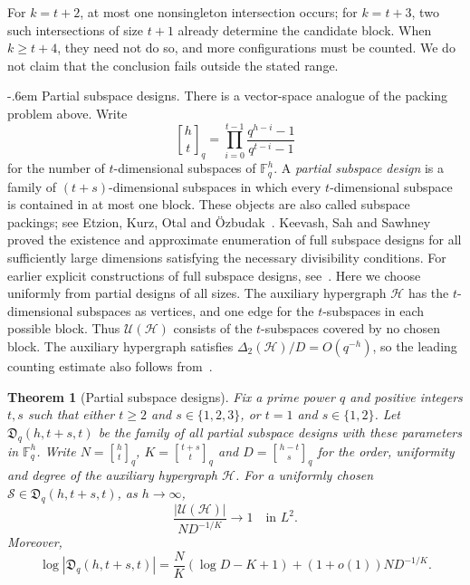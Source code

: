 \documentclass[11pt,reqno]{amsart}
\makeatletter
\numberwithin{equation}{section}
\renewcommand{\paragraph}{\@startsection{paragraph}{4}%
    \z@{.75\linespacing\@plus.2\linespacing\@minus.1\linespacing}%
    {-.6em}%
    {\normalfont\bfseries}}
\theoremstyle{plain}
\newtheorem{theorem}{Theorem}[section]
\theoremstyle{definition}
\newcommand{\calH}{\mathcal{H}}
\newcommand{\calS}{\mathcal{S}}
\newcommand{\calU}{\mathcal U}
\newcommand{\qbinom}[2]{\genfrac{[}{]}{0pt}{}{#1}{#2}_q}
\makeatother
\begin{document}
For $k=t+2$, at most one nonsingleton intersection occurs; for $k=t+3$, two such intersections of size $t+1$ already determine the candidate block.
When $k\ge t+4$, they need not do so, and more configurations must be counted.
We do not claim that the conclusion fails outside the stated range.

\paragraph{Partial subspace designs.}\label{par:subspaces}
There is a vector-space analogue of the packing problem above.
Write
\[
    \qbinom{h}{t}=\prod_{i=0}^{t-1}\frac{q^{h-i}-1}{q^{t-i}-1}
\]
for the number of $t$-dimensional subspaces of $\mathbb F_q^h$.
A \emph{partial subspace design} is a family of $(t+s)$-dimensional subspaces in which every $t$-dimensional subspace is contained in at most one block.
These objects are also called subspace packings; see Etzion, Kurz, Otal and \"Ozbudak~\cite{EKOO}.
Keevash, Sah and Sawhney~\cite{KSS} proved the existence and approximate enumeration of full subspace designs for all sufficiently large dimensions satisfying the necessary divisibility conditions.
For earlier explicit constructions of full subspace designs, see~\cite{BEOVW}.
Here we choose uniformly from partial designs of all sizes.
The auxiliary hypergraph $\calH$ has the $t$-dimensional subspaces as vertices, and one edge for the $t$-subspaces in each possible block.
Thus $\calU(\calH)$ consists of the $t$-subspaces covered by no chosen block.
The auxiliary hypergraph satisfies $\Delta_2(\calH)/D=O(q^{-h})$, so the leading counting estimate also follows from~\cite[Theorem~4(b)]{BF}.

\begin{theorem}[Partial subspace designs]\label{thm:subspaces}
    Fix a prime power $q$ and positive integers $t,s$ such that either $t\ge2$ and $s\in\{1,2,3\}$, or $t=1$ and $s\in\{1,2\}$.
    Let $\mathfrak D_q(h,t+s,t)$ be the family of all partial subspace designs with these parameters in $\mathbb F_q^h$.
    Write $N=\qbinom ht$, $K=\qbinom{t+s}t$ and $D=\qbinom{h-t}s$ for the order, uniformity and degree of the auxiliary hypergraph $\calH$.
    For a uniformly chosen $\calS\in\mathfrak D_q(h,t+s,t)$, as $h\to\infty$,
    \[
        \frac{|\calU(\calH)|}{ND^{-1/K}}\longrightarrow1\quad\text{in }L^2.
    \]
    Moreover,
    \[
        \log|\mathfrak D_q(h,t+s,t)| =\frac NK(\log D-K+1)+(1+o(1))ND^{-1/K}.
    \]
\end{theorem}
\end{document}

